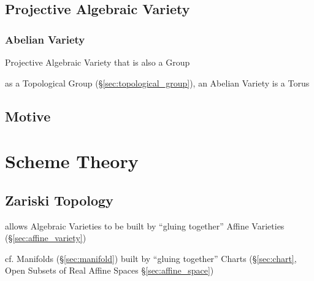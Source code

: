 \subsection{Projective Algebraic Variety}
\label{sec:projective_algebraic_variety}

\subsubsection{Abelian Variety}\label{sec:abelian_variety}

Projective Algebraic Variety that is also a Group

as a Topological Group (\S\ref{sec:topological_group}), an Abelian Variety is a
Torus %



\subsection{Motive}\label{sec:motive}



\section{Scheme Theory}\label{sec:scheme_theory}

\subsection{Zariski Topology}\label{sec:zariski_topology}

allows Algebraic Varieties to be built by ``gluing together'' Affine Varieties
 (\S\ref{sec:affine_variety})

cf. Manifolds (\S\ref{sec:manifold}) built by ``gluing together'' Charts
(\S\ref{sec:chart}, Open Subsets of Real Affine Spaces
\S\ref{sec:affine_space})



